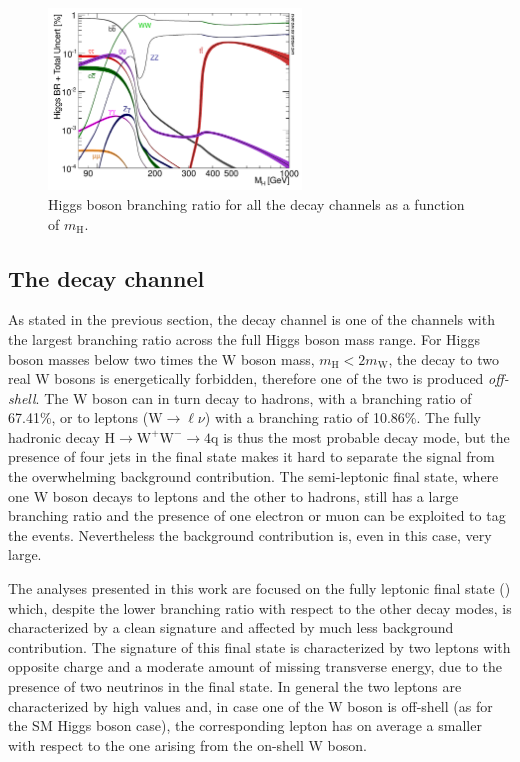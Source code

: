 \begin{figure}[htb]
\centering
\includegraphics[width=0.6\textwidth]{images/Higgs_BR.pdf}
\caption{Higgs boson branching ratio for all the decay channels as a function of $m_\mathrm{H}$.}\label{fig:higgs_br}
\end{figure}



\subsection{The \hww decay channel}\label{sec:HWW}
As stated in the previous section, the \hww decay channel is one of the channels with the largest branching ratio across the full Higgs boson mass range. For Higgs boson masses below two times the W boson mass, $m_\mathrm{H} < 2m_\mathrm{W}$, the decay to two real W bosons is energetically forbidden, therefore one of the two is produced \emph{off-shell}. The W boson can in turn decay to hadrons, with a branching ratio of 67.41\%, or to leptons ($\mathrm{W}\to\ell\nu$) with a branching ratio of 10.86\%. The fully hadronic decay $\mathrm{H\to W^+W^- \to 4q}$ is thus the most probable decay mode, but the presence of four jets in the final state makes it hard to separate the signal from the overwhelming background contribution. The semi-leptonic final state, where one W boson decays to leptons and the other to hadrons, still has a large branching ratio and the presence of one electron or muon can be exploited to tag the events. Nevertheless the background contribution is, even in this case, very large.

The analyses presented in this work are focused on the fully leptonic final state (\hwwllnn) which, despite the lower branching ratio with respect to the other decay modes, is characterized by a clean signature and affected by much less background contribution. The signature of this final state is characterized by two leptons with opposite charge and a moderate amount of missing transverse energy, due to the presence of two neutrinos in the final state. In general the two leptons are characterized by high \pt values and, in case one of the W boson is off-shell (as for the SM Higgs boson case), the corresponding lepton has on average a smaller \pt with respect to the one arising from the on-shell W boson.

